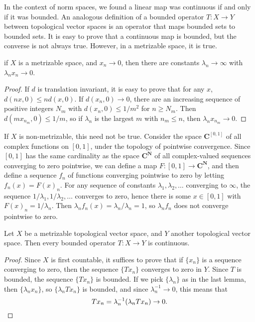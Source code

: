 In the context of norm spaces, we found a linear map was continuous if and only if it was bounded. An analogous definition of a bounded operator $T: X \to Y$ between topological vector spaces is an operator that maps bounded sets to bounded sets. It is easy to prove that a continuous map is bounded, but the converse is not always true. However, in a metrizable space, it is true.

\begin{lemma}
    if $X$ is a metrizable space, and $x_n \to 0$, then there are constants $\lambda_n \to \infty$ with $\lambda_n x_n \to 0$.
\end{lemma}
\begin{proof}
    If $d$ is translation invariant, it is easy to prove that for any $x$, $d(nx,0) \leq n d(x,0)$. If $d(x_n,0) \to 0$, there are an increasing sequence of positive integers $N_m$ with $d(x_n,0) \leq 1/m^2$ for $n \geq N_m$. Then $d(mx_{n_m},0) \leq 1/m$, so if $\lambda_n$ is the largest $m$ with $n_m \leq n$, then $\lambda_n x_{n_m} \to 0$.
\end{proof}

\begin{example}
    If $X$ is non-metrizable, this need not be true. Consider the space $\mathbf{C}^{[0,1]}$ of all complex functions on $[0,1]$, under the topology of pointwise convergence. Since $[0,1]$ has the same cardinality as the space $\mathbf{C}^{\mathbf{N}}$ of all complex-valued sequences converging to zero pointwise, we can define a map $F: [0,1] \to \mathbf{C}^{\mathbf{N}}$, and then define a sequence $f_n$ of functions converging pointwise to zero by letting $f_n(x) = F(x)_n$. For any sequence of constants $\lambda_1, \lambda_2, \dots$ converging to $\infty$, the sequence $1/\lambda_1, 1/\lambda_2, \dots$ converges to zero, hence there is some $x \in [0,1]$ with $F(x)_n = 1/\lambda_n$. Then $\lambda_n f_n(x) = \lambda_n/\lambda_n = 1$, so $\lambda_n f_n$ does not converge pointwise to zero.
\end{example}

\begin{theorem}
    Let $X$ be a metrizable topological vector space, and $Y$ another topological vector space. Then every bounded operator $T: X \to Y$ is continuous.
\end{theorem}
\begin{proof}
    Since $X$ is first countable, it suffices to prove that if $\{ x_n \}$ is a sequence converging to zero, then the sequence $\{ Tx_n \}$ converges to zero in $Y$. Since $T$ is bounded, the sequence $\{ Tx_n \}$ is bounded. If we pick $\{ \lambda_n \}$ as in the last lemma, then $\{ \lambda_n x_n \}$, so $\{ \lambda_n Tx_n \}$ is bounded, and since $\lambda_n^{-1} \to 0$, this means that
    \[ Tx_n = \lambda_n^{-1} (\lambda_n Tx_n) \to 0. \qedhere \]
\end{proof}

